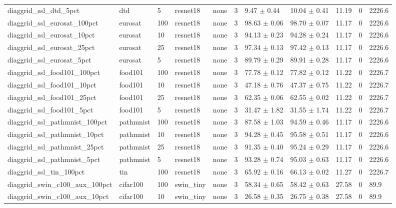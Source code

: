 \begin{tabular}{lllllllllll}
diaggrid_ssl_dtd_5pct & dtd & 5 & resnet18 & none & 3 & 9.47 $\pm$ 0.44 & 10.04 $\pm$ 0.41 & 11.19 & 0 & 2226.6 \\
diaggrid_ssl_eurosat_100pct & eurosat & 100 & resnet18 & none & 3 & 98.63 $\pm$ 0.06 & 98.70 $\pm$ 0.07 & 11.17 & 0 & 2226.6 \\
diaggrid_ssl_eurosat_10pct & eurosat & 10 & resnet18 & none & 3 & 94.13 $\pm$ 0.23 & 94.28 $\pm$ 0.24 & 11.17 & 0 & 2226.6 \\
diaggrid_ssl_eurosat_25pct & eurosat & 25 & resnet18 & none & 3 & 97.34 $\pm$ 0.13 & 97.42 $\pm$ 0.13 & 11.17 & 0 & 2226.6 \\
diaggrid_ssl_eurosat_5pct & eurosat & 5 & resnet18 & none & 3 & 89.79 $\pm$ 0.29 & 89.91 $\pm$ 0.28 & 11.17 & 0 & 2226.6 \\
diaggrid_ssl_food101_100pct & food101 & 100 & resnet18 & none & 3 & 77.78 $\pm$ 0.12 & 77.82 $\pm$ 0.12 & 11.22 & 0 & 2226.7 \\
diaggrid_ssl_food101_10pct & food101 & 10 & resnet18 & none & 3 & 47.18 $\pm$ 0.76 & 47.37 $\pm$ 0.75 & 11.22 & 0 & 2226.7 \\
diaggrid_ssl_food101_25pct & food101 & 25 & resnet18 & none & 3 & 62.35 $\pm$ 0.06 & 62.55 $\pm$ 0.02 & 11.22 & 0 & 2226.7 \\
diaggrid_ssl_food101_5pct & food101 & 5 & resnet18 & none & 3 & 31.47 $\pm$ 1.82 & 31.55 $\pm$ 1.74 & 11.22 & 0 & 2226.7 \\
diaggrid_ssl_pathmnist_100pct & pathmnist & 100 & resnet18 & none & 3 & 87.58 $\pm$ 1.03 & 94.59 $\pm$ 0.46 & 11.17 & 0 & 2226.6 \\
diaggrid_ssl_pathmnist_10pct & pathmnist & 10 & resnet18 & none & 3 & 94.28 $\pm$ 0.45 & 95.58 $\pm$ 0.51 & 11.17 & 0 & 2226.6 \\
diaggrid_ssl_pathmnist_25pct & pathmnist & 25 & resnet18 & none & 3 & 91.35 $\pm$ 0.40 & 95.24 $\pm$ 0.29 & 11.17 & 0 & 2226.6 \\
diaggrid_ssl_pathmnist_5pct & pathmnist & 5 & resnet18 & none & 3 & 93.28 $\pm$ 0.74 & 95.03 $\pm$ 0.63 & 11.17 & 0 & 2226.6 \\
diaggrid_ssl_tin_100pct & tin & 100 & resnet18 & none & 3 & 65.92 $\pm$ 0.16 & 66.13 $\pm$ 0.02 & 11.27 & 0 & 2226.7 \\
diaggrid_swin_c100_aux_100pct & cifar100 & 100 & swin_tiny & none & 3 & 58.34 $\pm$ 0.65 & 58.42 $\pm$ 0.63 & 27.58 & 0 & 89.9 \\
diaggrid_swin_c100_aux_10pct & cifar100 & 10 & swin_tiny & none & 3 & 26.58 $\pm$ 0.35 & 26.75 $\pm$ 0.38 & 27.58 & 0 & 89.9 \\

\end{tabular}
